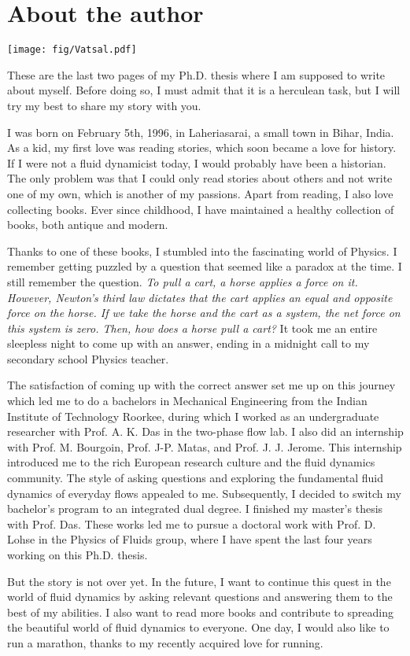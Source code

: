 \chapter{About the author}
\phantom{me}\hfill \texttt{[image: fig/Vatsal.pdf]}\\ %
\vspace{5mm}

These are the last two pages of my Ph.D. thesis where I am supposed to write about myself. Before doing so, I must admit that it is a herculean task, but I will try my best to share my story with you.

I was born on February 5th, 1996, in Laheriasarai, a small town in Bihar, India. As a kid, my first love was reading stories, which soon became a love for history. If I were not a fluid dynamicist today, I would probably have been a historian. The only problem was that I could only read stories about others and not write one of my own, which is another of my passions. Apart from reading, I also love collecting books. Ever since childhood, I have maintained a healthy collection of books, both antique and modern. 

Thanks to one of these books, I stumbled into the fascinating world of Physics. I remember getting puzzled by a question that seemed like a paradox at the time. I still remember the question. {\it To pull a cart, a horse applies a force on it. However, Newton's third law dictates that the cart applies an equal and opposite force on the horse. If we take the horse and the cart as a system, the net force on this system is zero. Then, how does a horse pull a cart?} It took me an entire sleepless night to come up with an answer, ending in a midnight call to my secondary school Physics teacher. 

The satisfaction of coming up with the correct answer set me up on this journey which led me to do a bachelors in Mechanical Engineering from the Indian Institute of Technology Roorkee, during which I worked as an undergraduate researcher with Prof. A. K. Das in the two-phase flow lab. I also did an internship with Prof. M. Bourgoin, Prof. J-P. Matas, and Prof. J. J. Jerome. This internship introduced me to the rich European research culture and the fluid dynamics community. The style of asking questions and exploring the fundamental fluid dynamics of everyday flows appealed to me. Subsequently, I decided to switch my bachelor's program to an integrated dual degree. I finished my master's thesis with Prof. Das. These works led me to pursue a doctoral work with Prof. D. Lohse in the Physics of Fluids group, where I have spent the last four years working on this Ph.D. thesis. 

But the story is not over yet. In the future, I want to continue this quest in the world of fluid dynamics by asking relevant questions and answering them to the best of my abilities. I also want to read more books and contribute to spreading the beautiful world of fluid dynamics to everyone. One day, I would also like to run a marathon, thanks to my recently acquired love for running. 



